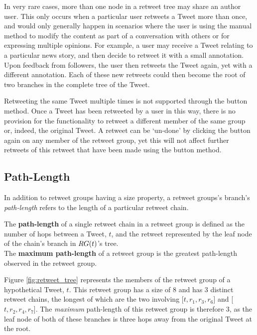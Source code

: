 In very rare cases, more than one node in a retweet tree may share an author user. This only occurs when a particular user retweets a Tweet more than once, and would only generally happen in scenarios where the user is using the manual method to modify the content as part of a conversation with others or for expressing multiple opinions. For example, a user may receive a Tweet relating to a particular news story, and then decide to retweet it with a small annotation. Upon feedback from followers, the user then retweets the Tweet again, yet with a different annotation. Each of these new retweets could then become the root of two branches in the complete tree of the Tweet.

Retweeting the same Tweet multiple times is not supported through the button method. Once a Tweet has been retweeted by a user in this way, there is no provision for the functionality to retweet a different member of the same group or, indeed, the original Tweet. A retweet can be `un-done' by clicking the button again on any member of the retweet group, yet this will not affect further retweets of this retweet that have been made using the button method.


\subsection{Path-Length}
In addition to retweet groups having a size property, a retweet groups's branch's \textit{path-length} refers to the length of a particular retweet chain. 

\begin{mydefinition}
\label{definition:path_length}
The \textbf{path-length} of a single retweet chain in a retweet group is defined as the number of hops between a Tweet, $t$, and the retweet represented by the leaf node of the chain's branch in $RG(t)$'s tree.\\
The \textbf{maximum path-length} of a retweet group is the greatest path-length observed in the retweet group.
\end{mydefinition}

Figure \ref{fig:retweet_tree} represents the members of the retweet group of a hypothetical Tweet, $t$. This retweet group has a size of 8 and has 3 distinct retweet chains, the longest of which are the two involving [$t, r_1, r_3, r_6$] and [$t, r_2, r_4, r_7$]. The \textit{maximum} path-length of this retweet group is therefore 3, as the leaf node of both of these branches is three hops away from the original Tweet at the root.

